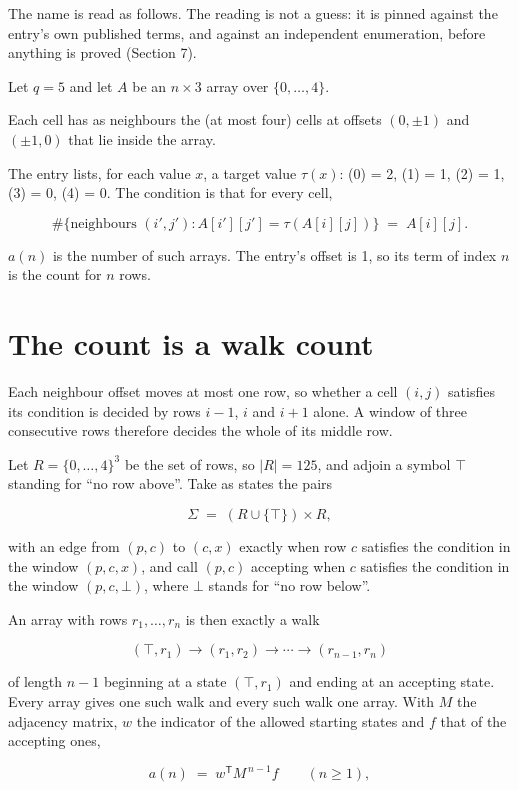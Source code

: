 \documentclass[11pt]{article}
\theoremstyle{definition}
\begin{document}
The name is read as follows. The reading is not a guess: it is pinned against the entry's own published terms, and against an independent enumeration, before anything is proved (Section 7).

Let $q = 5$ and let $A$ be an $n \times 3$ array over $\{0,\dots,4\}$.

Each cell has as neighbours the (at most four) cells at offsets $(0,\pm1)$ and $(\pm1,0)$ that lie inside the array.

The entry lists, for each value $x$, a target value $\tau(x)$: \tau(0) = 2, \tau(1) = 1, \tau(2) = 1, \tau(3) = 0, \tau(4) = 0. The condition is that for every cell,

\[\#\{\text{neighbours } (i',j') : A[i'][j'] = \tau(A[i][j])\} \;=\; A[i][j].\]

$a(n)$ is the number of such arrays. The entry's offset is 1, so its term of index $n$ is the count for $n$ rows.

\section{The count is a walk count}

Each neighbour offset moves at most one row, so whether a cell $(i,j)$ satisfies its condition is decided by rows $i-1$, $i$ and $i+1$ alone. A window of three consecutive rows therefore decides the whole of its middle row.

Let $R = \{0,\dots,4\}^{3}$ be the set of rows, so $|R| = 125$, and adjoin a symbol $\top$ standing for ``no row above''. Take as states the pairs

\[\Sigma \;=\; (R \cup \{\top\}) \times R,\]

with an edge from $(p,c)$ to $(c,x)$ exactly when row $c$ satisfies the condition in the window $(p,c,x)$, and call $(p,c)$ accepting when $c$ satisfies the condition in the window $(p,c,\bot)$, where $\bot$ stands for ``no row below''.

An array with rows $r_1,\dots,r_n$ is then exactly a walk

\[(\top,r_1) \to (r_1,r_2) \to \cdots \to (r_{n-1},r_n)\]

of length $n-1$ beginning at a state $(\top,r_1)$ and ending at an accepting state. Every array gives one such walk and every such walk one array. With $M$ the adjacency matrix, $w$ the indicator of the allowed starting states and $f$ that of the accepting ones,

\[a(n) \;=\; w^{\mathsf T} M^{\,n-1} f \qquad (n \ge 1),\]
\end{document}
